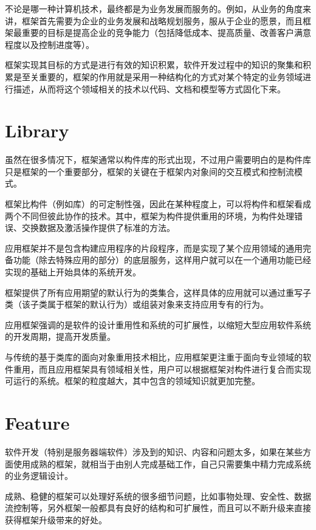 不论是哪一种计算机技术，最终都是为业务发展而服务的。例如，从业务的角度来讲，框架首先需要为企业的业务发展和战略规划服务，服从于企业的愿景，而且框架最重要的目标是提高企业的竞争能力（包括降低成本、提高质量、改善客户满意程度以及控制进度等）。

框架实现其目标的方式是进行有效的知识积累，软件开发过程中的知识的聚集和积累是至关重要的，框架的作用就是采用一种结构化的方式对某个特定的业务领域进行描述，从而将这个领域相关的技术以代码、文档和模型等方式固化下来。


\section{Library}


虽然在很多情况下，框架通常以构件库的形式出现，不过用户需要明白的是构件库只是框架的一个重要部分，框架的关键在于框架内对象间的交互模式和控制流模式。

框架比构件（例如库）的可定制性强，因此在某种程度上，可以将构件和框架看成两个不同但彼此协作的技术。其中，框架为构件提供重用的环境，为构件处理错误、交换数据及激活操作提供了标准的方法。

应用框架并不是包含构建应用程序的片段程序，而是实现了某个应用领域的通用完备功能（除去特殊应用的部分）的底层服务，这样用户就可以在一个通用功能已经实现的基础上开始具体的系统开发。

框架提供了所有应用期望的默认行为的类集合，这样具体的应用就可以通过重写子类（该子类属于框架的默认行为）或组装对象来支持应用专有的行为。

应用框架强调的是软件的设计重用性和系统的可扩展性，以缩短大型应用软件系统的开发周期，提高开发质量。

与传统的基于类库的面向对象重用技术相比，应用框架更注重于面向专业领域的软件重用，而且应用框架具有领域相关性，用户可以根据框架对构件进行复合而实现可运行的系统。框架的粒度越大，其中包含的领域知识就更加完整。



\section{Feature}

软件开发（特别是服务器端软件）涉及到的知识、内容和问题太多，如果在某些方面使用成熟的框架，就相当于由别人完成基础工作，自己只需要集中精力完成系统的业务逻辑设计。

成熟、稳健的框架可以处理好系统的很多细节问题，比如事物处理、安全性、数据流控制等，另外框架一般都具有良好的结构和可扩展性，而且可以不断升级来直接获得框架升级带来的好处。

